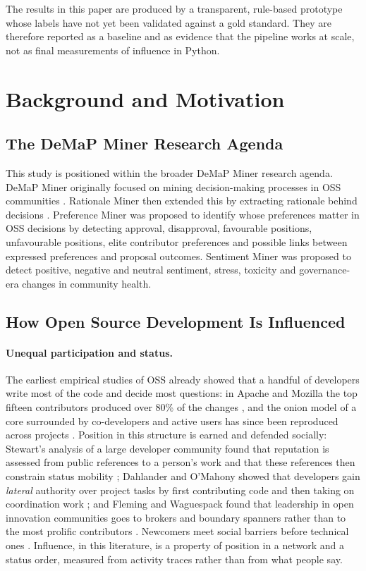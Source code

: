 \documentclass[sigconf,screen]{acmart}
\begin{document}
The results in this paper are produced by a transparent, rule-based prototype whose labels have not yet been validated against a gold standard. They are therefore reported as a baseline and as evidence that the pipeline works at scale, not as final measurements of influence in Python.

\section{Background and Motivation}
\label{sec:background}

\subsection{The DeMaP Miner Research Agenda}

This study is positioned within the broader DeMaP Miner research agenda. DeMaP Miner originally focused on mining decision-making processes in OSS communities \cite{sharma2022demap}. Rationale Miner then extended this by extracting rationale behind decisions \cite{sharma2024rationale}. Preference Miner was proposed to identify whose preferences matter in OSS decisions by detecting approval, disapproval, favourable positions, unfavourable positions, elite contributor preferences and possible links between expressed preferences and proposal outcomes. Sentiment Miner was proposed to detect positive, negative and neutral sentiment, stress, toxicity and governance-era changes in community health.


\subsection{How Open Source Development Is Influenced}
\label{sec:litreview}

\paragraph{Unequal participation and status.} The earliest empirical studies of OSS already showed that a handful of developers write most of the code and decide most questions: in Apache and Mozilla the top fifteen contributors produced over 80\% of the changes \cite{mockus2002}, and the onion model of a core surrounded by co-developers and active users has since been reproduced across projects \cite{crowston2005, vonkrogh2003}. Position in this structure is earned and defended socially: Stewart's analysis of a large developer community found that reputation is assessed from public references to a person's work and that these references then constrain status mobility \cite{stewart2005}; Dahlander and O'Mahony showed that developers gain \emph{lateral} authority over project tasks by first contributing code and then taking on coordination work \cite{dahlander2011}; and Fleming and Waguespack found that leadership in open innovation communities goes to brokers and boundary spanners rather than to the most prolific contributors \cite{fleming2007}. Newcomers meet social barriers before technical ones \cite{steinmacher2015}. Influence, in this literature, is a property of position in a network and a status order, measured from activity traces rather than from what people say.
\end{document}
